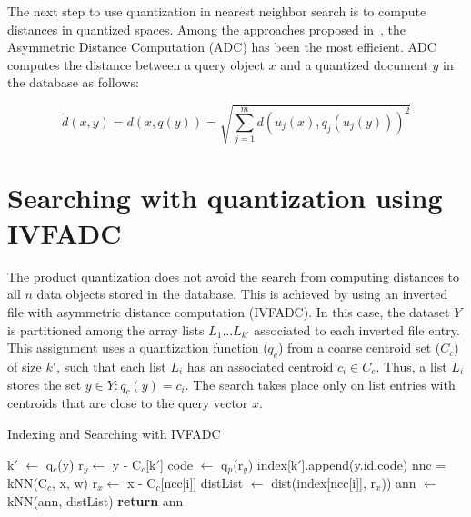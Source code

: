 The next step to use quantization in nearest neighbor search is to compute distances
in quantized spaces. Among the approaches proposed in~\cite{5432202},
the Asymmetric Distance Computation (ADC) has been the most efficient. ADC 
computes the distance between a query object $x$ and a quantized document $y$
in the database as follows:

\begin{equation}
\tilde{d}(x,y) = d(x, q(y)) = \sqrt{\sum_{j=1}^{m} d(u_j(x), q_j(u_j(y)))^2}
\end{equation}

\section{Searching with quantization using IVFADC}

The product quantization does not avoid the search from computing distances to all $n$ data objects stored
in the database. This is achieved by using an inverted file with asymmetric distance
computation (IVFADC). In
this case, the dataset $Y$ is partitioned among the array lists $L_1 \ldots L_{k'}$ associated to each inverted file entry.
This assignment uses a quantization function ($q_c$) from a coarse centroid set ($C_c$)
of size $k'$, such that each list $L_i$ has an associated centroid $c_i \in C_c$. Thus, a 
list $L_i$ stores the set ${y \in Y : q_c(y) = c_i}$. The search  
takes place only on list entries with centroids that are close to the query 
vector $x$.


\begin{algorithm}[h]
\caption{Indexing and Searching with IVFADC}
\label{alg:ivfadc}
\begin{algorithmic}[1]
    \State k$'$ $\gets$ q$_c$(y)
    \State r$_y \gets$ y - C$_c$[k$'$]
    \State code $\gets$ q$_p$(r$_y$)
    \State index[k$'$].append(y.id,code)
\EndProcedure
{}
    \State nnc = kNN(C$_c$, x, w) 
        \State r$_x \gets$ x - C$_c$[ncc[i]] 
        \State distList $\gets$ dist(index[ncc[i]], r$_x$))
        \State ann $\gets$ kNN(ann, distList)
    \EndFor
    \State \textbf{return} ann
\EndProcedure
\end{algorithmic}
\end{algorithm}

